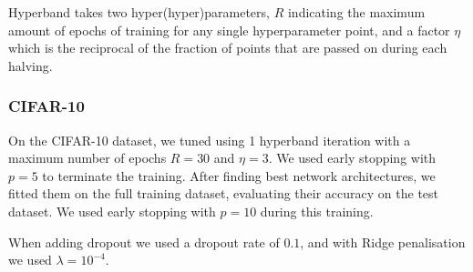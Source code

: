         Hyperband takes two hyper(hyper)parameters, $R$ indicating the maximum amount of epochs of training for any single hyperparameter point, and a factor $\eta$ which is the reciprocal of the fraction of points that are passed on during each halving.


    \subsubsection{CIFAR-10}
        On the CIFAR-10 dataset, we tuned using 1 hyperband iteration with a maximum number of epochs $R=30$ and $\eta=3$. We used early stopping with $p=5$ to terminate the training. After finding best network architectures, we fitted them on the full training dataset, evaluating their accuracy on the test dataset. We used early stopping with $p=10$ during this training.

        When adding dropout we used a dropout rate of $0.1$, and with Ridge penalisation we used $\lambda=10^{-4}$.

